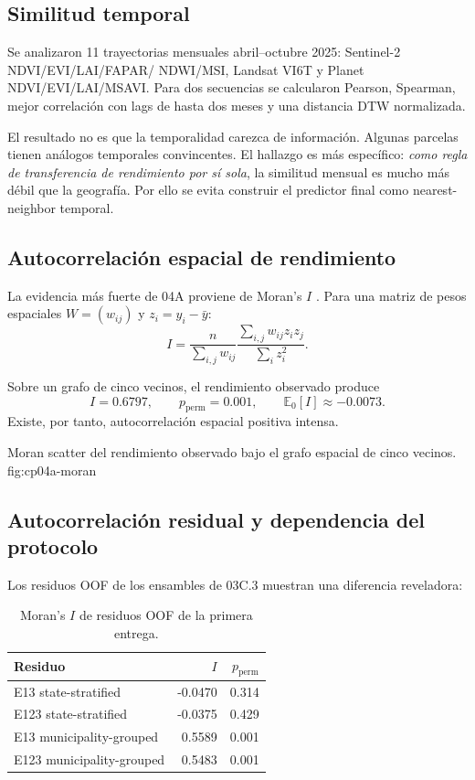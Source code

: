 \subsection{Similitud temporal}

Se analizaron 11 trayectorias mensuales abril--octubre 2025: Sentinel-2 NDVI/EVI/LAI/FAPAR/
NDWI/MSI, Landsat VI6T y Planet NDVI/EVI/LAI/MSAVI. Para dos secuencias se calcularon
Pearson, Spearman, mejor correlación con lags de hasta dos meses y una distancia DTW
normalizada.

El resultado no es que la temporalidad carezca de información. Algunas parcelas tienen
análogos temporales convincentes. El hallazgo es más específico: \emph{como regla de
transferencia de rendimiento por sí sola}, la similitud mensual es mucho más débil que la
geografía. Por ello se evita construir el predictor final como nearest-neighbor temporal.

\subsection{Autocorrelación espacial de rendimiento}

La evidencia más fuerte de 04A proviene de Moran's $I$ \citep{Moran1950}. Para una matriz de
pesos espaciales $W=(w_{ij})$ y $z_i=y_i-\bar y$:
\begin{equation}
I
=
\frac{n}{\sum_{i,j}w_{ij}}
\frac{\sum_{i,j}w_{ij}z_i z_j}
{\sum_i z_i^2}.
\label{eq:moran}
\end{equation}

Sobre un grafo de cinco vecinos, el rendimiento observado produce
\[
I=0.6797,\qquad p_{\mathrm{perm}}=0.001,
\qquad \mathbb E_0[I]\approx-0.0073.
\]
Existe, por tanto, autocorrelación espacial positiva intensa.

{Moran scatter del rendimiento observado bajo el grafo espacial de cinco vecinos.}
{fig:cp04a-moran}

\subsection{Autocorrelación residual y dependencia del protocolo}

Los residuos OOF de los ensambles de 03C.3 muestran una diferencia reveladora:
\begin{table}[H]
\centering
\caption{Moran's $I$ de residuos OOF de la primera entrega.}
\label{tab:cp04a-residual-moran}
\begin{tabular}{lrr}
\toprule
Residuo & $I$ & $p_{\mathrm{perm}}$ \\
\midrule
E13 state-stratified & -0.0470 & 0.314 \\
E123 state-stratified & -0.0375 & 0.429 \\
E13 municipality-grouped & 0.5589 & 0.001 \\
E123 municipality-grouped & 0.5483 & 0.001 \\
\bottomrule
\end{tabular}
\end{table}

